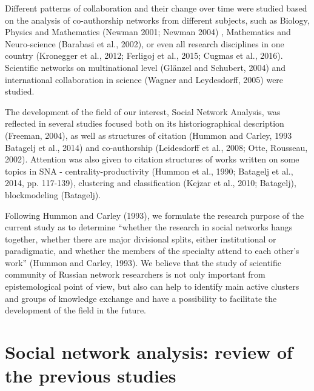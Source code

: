 \documentclass[11pt]{article} %
\begin{document}
Different patterns of collaboration and their change over time were studied based on the analysis of co-authorship networks from different subjects, such as Biology, Physics and Mathematics (Newman 2001; Newman 2004)  , Mathematics and Neuro-science (Barabasi et al., 2002), or even all research disciplines in one country (Kronegger et al., 2012; Ferligoj et al., 2015; Cugmas et al., 2016). Scientific networks on multinational level (Glänzel and Schubert, 2004) and international collaboration in science (Wagner and Leydesdorff, 2005) were studied.  \medskip 

The development of the field of our interest, Social Network Analysis, was reflected in several studies focused both on its historiographical description (Freeman, 2004), as well as structures of citation (Hummon and Carley, 1993 Batagelj et al., 2014) and co-authorship (Leidesdorff et al., 2008; Otte, Rousseau, 2002). Attention was also given to citation structures of works written on some topics in SNA - centrality-productivity (Hummon et al., 1990; Batagelj et al., 2014, pp. 117-139), clustering and classification (Kejzar et al., 2010; Batagelj), blockmodeling (Batagelj). \medskip 

Following Hummon and Carley (1993), we formulate the research purpose of the current study as to determine “whether the research in social networks hangs together, whether there are major divisional splits, either institutional or paradigmatic, and whether the members of the specialty attend to each other’s work” (Hummon and Carley, 1993). We believe that the study of scientific community of Russian network researchers is not only important from epistemological point of view, but also can help to identify main active clusters and groups of knowledge exchange and have a possibility to facilitate the development of the field in the future.  \medskip  

\section{Social network analysis: review of the previous studies}
\end{document}

